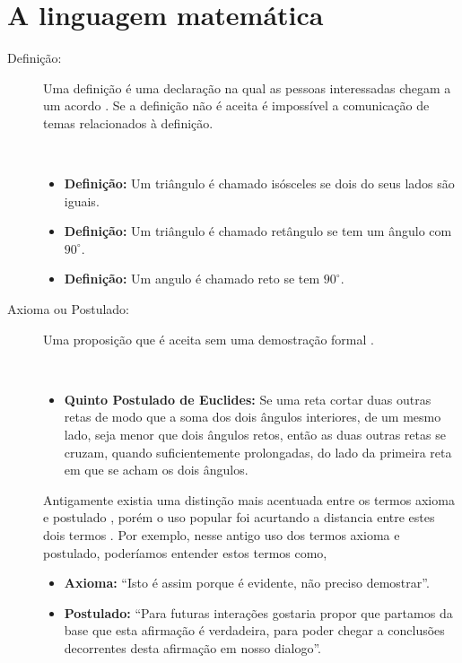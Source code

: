 
\section{A linguagem matemática}

\begin{description}

\item[Definição:]  Uma definição é uma declaração na qual as pessoas interessadas chegam a um acordo \cite[pp. 37]{solow1987como}.
Se a definição não é aceita é impossível a comunicação de temas relacionados à definição.
\begin{example}~\\
\begin{itemize}
\item \textbf{Definição:} Um triângulo é chamado isósceles se dois do seus lados são iguais.
\item \textbf{Definição:} Um triângulo é chamado retângulo se tem um ângulo com $90^{\circ}$.
\item \textbf{Definição:} Um angulo é chamado reto se tem  $90^{\circ}$.
\end{itemize}
\end{example}

\item[Axioma ou Postulado:]   
Uma proposição que é aceita sem uma demostração formal \cite[pp. 47]{fossa2009introducao} \cite[pp. 41]{solow1987como}.
\begin{example}~\\
\begin{itemize}
\item \textbf{Quinto Postulado de Euclides:} Se uma reta cortar duas outras retas de modo que a soma dos dois ângulos interiores, de um mesmo lado, seja menor que dois ângulos retos, então as duas outras retas se cruzam, quando suficientemente prolongadas, do lado da primeira reta em que se acham os dois ângulos.
\end{itemize}
\end{example}

Antigamente existia uma distinção mais acentuada entre os termos axioma e postulado \cite[pp. 115]{de1863ensaio},
porém o uso popular foi acurtando a distancia entre estes dois termos \cite[pp. 243]{mora2000dicionario}.
Por exemplo, nesse antigo uso dos termos axioma e postulado, poderíamos entender estos termos como,
\begin{itemize}
\item \textbf{Axioma:} ``Isto é assim porque é evidente, não preciso demostrar''.
\item \textbf{Postulado:} ``Para futuras interações gostaria propor que partamos da base que esta afirmação é verdadeira,
 para poder chegar a conclusões decorrentes desta afirmação em nosso dialogo''.
\end{itemize}



\end{description}
